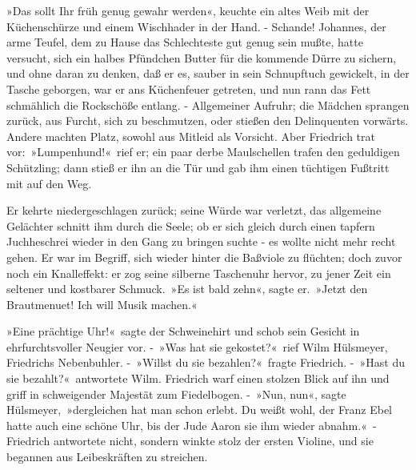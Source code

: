 »Das sollt Ihr früh genug gewahr werden«, keuchte ein altes Weib mit der Küchenschürze und einem Wischhader in der Hand. - Schande! Johannes, der arme Teufel, dem zu Hause das Schlechteste gut genug sein mußte, hatte versucht, sich ein halbes Pfündchen Butter für die kommende Dürre zu sichern, und ohne daran zu denken, daß er es, sauber in sein Schnupftuch gewickelt, in der Tasche geborgen, war er ans Küchenfeuer getreten, und nun rann das Fett schmählich die Rockschöße entlang. - Allgemeiner Aufruhr; die Mädchen sprangen zurück, aus Furcht, sich zu beschmutzen, oder stießen den Delinquenten vorwärts. Andere machten Platz, sowohl aus Mitleid als Vorsicht. Aber Friedrich trat vor: »Lumpenhund!« rief er; ein paar derbe Maulschellen trafen den geduldigen Schützling; dann stieß er ihn an die Tür und gab ihm einen tüchtigen Fußtritt mit auf den Weg.

Er kehrte niedergeschlagen zurück; seine Würde war verletzt, das allgemeine Gelächter schnitt ihm durch die Seele; ob er sich gleich durch einen tapfern Juchheschrei wieder in den Gang zu bringen suchte - es wollte nicht mehr recht gehen. Er war im Begriff, sich wieder hinter die Baßviole zu flüchten; doch zuvor noch ein Knalleffekt: er zog seine silberne Taschenuhr hervor, zu jener Zeit ein seltener und kostbarer Schmuck. »Es ist bald zehn«, sagte er. »Jetzt den Brautmenuet! Ich will Musik machen.«

»Eine prächtige Uhr!« sagte der Schweinehirt und schob sein Gesicht in ehrfurchtsvoller Neugier vor. - »Was hat sie gekostet?« rief Wilm Hülsmeyer, Friedrichs Nebenbuhler. - »Willst du sie bezahlen?« fragte Friedrich. - »Hast du sie bezahlt?« antwortete Wilm. Friedrich warf einen stolzen Blick auf ihn und griff in schweigender Majestät zum Fiedelbogen. - »Nun, nun«, sagte Hülsmeyer, »dergleichen hat man schon erlebt. Du weißt wohl, der Franz Ebel hatte auch eine schöne Uhr, bis der Jude Aaron sie ihm wieder abnahm.« - Friedrich antwortete nicht, sondern winkte stolz der ersten Violine, und sie begannen aus Leibeskräften zu streichen.

